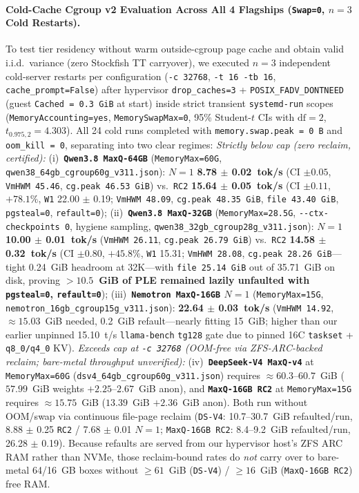 \documentclass[10pt,twocolumn]{article}
\begin{document}
\paragraph{Cold-Cache Cgroup v2 Evaluation Across All 4 Flagships (\texttt{Swap=0}, $n=3$ Cold Restarts).}
To test tier residency without warm outside-cgroup page cache and obtain valid i.i.d.\ variance (zero Stockfish TT carryover), we executed $n=3$ independent cold-server restarts per configuration (\texttt{-c 32768}, \texttt{-t 16 -tb 16}, \texttt{cache\_prompt=False}) after hypervisor \texttt{drop\_caches=3} + \texttt{POSIX\_FADV\_DONTNEED} (guest \texttt{Cached = 0.3~GiB} at start) inside strict transient \texttt{systemd-run} scopes (\texttt{MemoryAccounting=yes}, \texttt{MemorySwapMax=0}, 95\% Student-$t$ CIs with $\text{df}=2$, $t_{0.975,2}=4.303$). All 24 cold runs completed with \texttt{memory.swap.peak = 0~B} and \texttt{oom\_kill = 0}, separating into two clear regimes:
\emph{Strictly below cap (zero reclaim, certified):}
(i)~\textbf{\texttt{Qwen3.8 MaxQ-64GB}} (\texttt{MemoryMax=60G}, \texttt{qwen38\_64gb\_cgroup60g\_v311.json}): $N=1$ \textbf{8.78 $\pm$ 0.02~tok/s} (CI $\pm 0.05$, \texttt{VmHWM 45.46}, \texttt{cg.peak 46.53~GiB}) vs.\ \texttt{RC2} \textbf{15.64 $\pm$ 0.05~tok/s} (CI $\pm 0.11$, $+78.1\%$, \texttt{W1} 22.00 $\pm$ 0.19; \texttt{VmHWM 48.09}, \texttt{cg.peak 48.35~GiB}, \texttt{file 43.40~GiB}, \texttt{pgsteal=0}, \texttt{refault=0});
(ii)~\textbf{\texttt{Qwen3.8 MaxQ-32GB}} (\texttt{MemoryMax=28.5G}, \texttt{{-}{-}ctx-checkpoints 0}, hygiene sampling, \texttt{qwen38\_32gb\_cgroup28g\_v311.json}): $N=1$ \textbf{10.00 $\pm$ 0.01~tok/s} (\texttt{VmHWM 26.11}, \texttt{cg.peak 26.79~GiB}) vs.\ \texttt{RC2} \textbf{14.58 $\pm$ 0.32~tok/s} (CI $\pm 0.80$, $+45.8\%$, \texttt{W1} 15.31; \texttt{VmHWM 28.08}, \texttt{cg.peak 28.26~GiB}---tight 0.24~GiB headroom at 32K---with \texttt{file 25.14~GiB} out of 35.71~GiB on disk, proving \textbf{$>10.5$~GiB of PLE remained lazily unfaulted with \texttt{pgsteal=0}, \texttt{refault=0}});
(iii)~\textbf{\texttt{Nemotron MaxQ-16GB} $N=1$} (\texttt{MemoryMax=15G}, \texttt{nemotron\_16gb\_cgroup15g\_v311.json}): \textbf{22.64 $\pm$ 0.03~tok/s} (\texttt{VmHWM 14.92}, ${\approx}15.03$~GiB needed, 0.2~GiB refault---nearly fitting 15~GiB; higher than our earlier unpinned 15.10~t/s \texttt{llama-bench} \texttt{tg128} gate due to pinned 16C \texttt{taskset} + \texttt{q8\_0/q4\_0} KV).
\emph{Exceeds cap at \texttt{-c 32768} (OOM-free via ZFS-ARC-backed reclaim; bare-metal throughput unverified):}
(iv)~\textbf{\texttt{DeepSeek-V4 MaxQ-v4}} at \texttt{MemoryMax=60G} (\texttt{dsv4\_64gb\_cgroup60g\_v311.json}) requires ${\approx}60.3$--$60.7$~GiB ($57.99$~GiB weights $+ 2.25$--$2.67$~GiB anon), and \textbf{\texttt{MaxQ-16GB RC2}} at \texttt{MemoryMax=15G} requires ${\approx}15.75$~GiB ($13.39$~GiB $+ 2.36$~GiB anon). Both run without OOM/swap via continuous file-page reclaim (\texttt{DS-V4}: 10.7--30.7~GiB refaulted/run, 8.88 $\pm$ 0.25 \texttt{RC2} / 7.68 $\pm$ 0.01 $N=1$; \texttt{MaxQ-16GB RC2}: 8.4--9.2~GiB refaulted/run, 26.28 $\pm$ 0.19). Because refaults are served from our hypervisor host's ZFS ARC RAM rather than NVMe, those reclaim-bound rates do \emph{not} carry over to bare-metal 64/16~GB boxes without $\ge 61$~GiB (\texttt{DS-V4}) / $\ge 16$~GiB (\texttt{MaxQ-16GB RC2}) free RAM.
\end{document}
